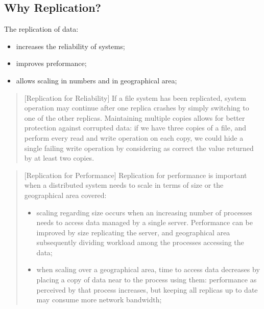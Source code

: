 \documentclass[11pt, a4paper]{article}
\begin{document}
\subsection{Why Replication?}\label{sub:why_replication_} %
The replication of data:
\begin{itemize}
    \item increases the reliability of systems;
    \item improves preformance;
    \item allows scaling in numbers and in geographical area;
\end{itemize}
\begin{quote}[Replication for Reliability]{}
    If a file system has been replicated, system operation may continue after one replica crashes by simply switching to one of the other replicas.
    Maintaining multiple copies allows for better protection against corrupted data: if we have three copies of a file, and perform every read and write operation on each copy, we could hide a single failing write operation by considering as correct the value returned by at least two copies.
\end{quote}
\begin{quote}[Replication for Performance]{}
    Replication for performance is important when a distributed system needs to scale in terms of size or the geographical area covered:
    \begin{itemize}
        \item scaling regarding size occurs when an increasing number of processes needs to access data managed by a single server. Performance can be improved by size replicating the server, and geographical area subsequently dividing workload among the processes accessing the data;
        \item when scaling over a geographical area, time to access data decreases by placing a copy of data near to the process using them: performance as perceived by that process increases, but keeping all replicas up to date may consume more network bandwidth;
    \end{itemize}
\end{quote}
%
%
%
\end{document}
